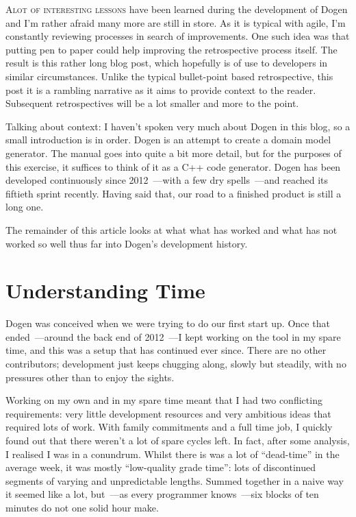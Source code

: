 \documentclass{book}
\begin{document}
\lettrine{A} {lot of interesting lessons} have been learned during the
development of Dogen and I'm rather afraid many more are still in
store. As it is typical with agile, I'm constantly reviewing processes
in search of improvements. One such idea was that putting pen to paper
could help improving the retrospective process itself. The result is
this rather long blog post, which hopefully is of use to developers in
similar circumstances. Unlike the typical bullet-point based
retrospective, this post it is a rambling narrative as it aims to
provide context to the reader. Subsequent retrospectives will be a lot
smaller and more to the point.

Talking about context: I haven't spoken very much about Dogen in this
blog, so a small introduction is in order. Dogen is an attempt to
create a domain model generator. The manual goes into quite a bit more
detail, but for the purposes of this exercise, it suffices to think of
it as a C++ code generator. Dogen has been developed continuously
since 2012~---with a few dry spells~---and reached its fiftieth sprint
recently. Having said that, our road to a finished product is still a
long one.

The remainder of this article looks at what what has worked and what
has not worked so well thus far into Dogen's development history.

\section{Understanding Time}

Dogen was conceived when we were trying to do our first start up. Once
that ended~---around the back end of 2012~---I kept working on the tool
in my spare time, and this was a setup that has continued ever
since. There are no other contributors; development just keeps
chugging along, slowly but steadily, with no pressures other than to
enjoy the sights.

Working on my own and in my spare time meant that I had two
conflicting requirements: very little development resources and very
ambitious ideas that required lots of work. With family commitments
and a full time job, I quickly found out that there weren't a lot of
spare cycles left. In fact, after some analysis, I realised I was in a
conundrum. Whilst there is was a lot of ``dead-time'' in the average
week, it was mostly ``low-quality grade time'': lots of discontinued
segments of varying and unpredictable lengths. Summed together in a
naive way it seemed like a lot, but~---as every programmer
knows~---six blocks of ten minutes do not one solid hour make.
\end{document}
